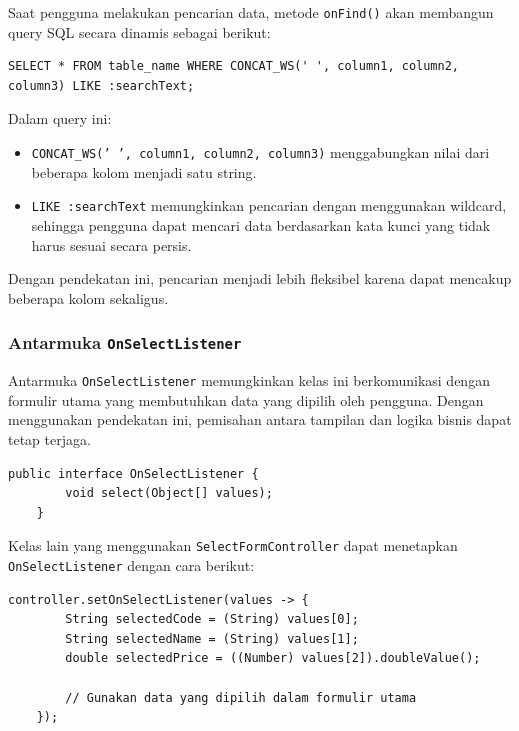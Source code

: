 Saat pengguna melakukan pencarian data, metode \texttt{onFind()} akan membangun query SQL secara dinamis sebagai berikut:

\begin{lstlisting}[style=SQL]
	SELECT * FROM table_name WHERE CONCAT_WS(' ', column1, column2, column3) LIKE :searchText;
\end{lstlisting}

Dalam query ini:
\begin{itemize}
	\item \texttt{CONCAT\_WS(' ', column1, column2, column3)} menggabungkan nilai dari beberapa kolom menjadi satu string.
	\item \texttt{LIKE :searchText} memungkinkan pencarian dengan menggunakan wildcard, sehingga pengguna dapat mencari data berdasarkan kata kunci yang tidak harus sesuai secara persis.
\end{itemize}

Dengan pendekatan ini, pencarian menjadi lebih fleksibel karena dapat mencakup beberapa kolom sekaligus.

\subsubsection{Antarmuka \texttt{OnSelectListener}}

Antarmuka \texttt{OnSelectListener} memungkinkan kelas ini berkomunikasi dengan formulir utama yang membutuhkan data yang dipilih oleh pengguna. Dengan menggunakan pendekatan ini, pemisahan antara tampilan dan logika bisnis dapat tetap terjaga.

\begin{lstlisting}[style=JavaStyle]
	public interface OnSelectListener {
		void select(Object[] values);
	}
\end{lstlisting}

Kelas lain yang menggunakan \texttt{SelectFormController} dapat menetapkan \texttt{OnSelectListener} dengan cara berikut:

\begin{lstlisting}[style=JavaStyle]
	controller.setOnSelectListener(values -> {
		String selectedCode = (String) values[0];
		String selectedName = (String) values[1];
		double selectedPrice = ((Number) values[2]).doubleValue();
		
		// Gunakan data yang dipilih dalam formulir utama
	});
\end{lstlisting}


